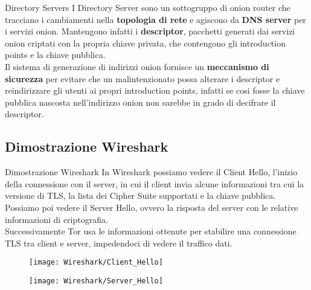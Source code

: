 \begin{frame}{Directory Servers} 
    I Directory Server sono un sottogruppo di onion router che tracciano i cambiamenti nella \textbf{topologia di rete} e agiscono da \textbf{DNS server} per i servizi onion.
    Mantengono infatti i \textbf{descriptor}, pacchetti generati dai servizi onion criptati con la propria chiave privata, che contengono gli introduction points e la chiave pubblica.\\
    
    Il sistema di generazione di indirizzi onion fornisce un \textbf{meccanismo di sicurezza} per evitare che un malintenzionato possa alterare i descriptor e reindirizzare gli utenti ai propri introduction points, infatti se cosi fosse la chiave pubblica nascosta nell'indirizzo onion non sarebbe in grado di decifrare il descriptor.
\end{frame}

\subsection{Dimostrazione Wireshark}

\begin{frame}{Dimostrazione Wireshark}
    In Wireshark possiamo vedere il Client Hello, l'inizio della connessione con il server, in cui il client invia alcune informazioni tra cui la versione di TLS, la lista dei Cipher Suite supportati e la chiave pubblica.
    Possiamo poi vedere il Server Hello, ovvero la risposta del server con le relative informazioni di criptografia. \\
    Successivamente Tor usa le informazioni ottenute per stabilire una connessione TLS tra client e server, impedendoci di vedere il traffico dati.
\end{frame}

\begin{frame} 
    \begin{figure}
        \centering
        \texttt{[image: Wireshark/Client\_Hello]}
    \end{figure}
\end{frame}

\begin{frame} 
    \begin{figure}
        \centering
        \texttt{[image: Wireshark/Server\_Hello]}
    \end{figure}
\end{frame}

